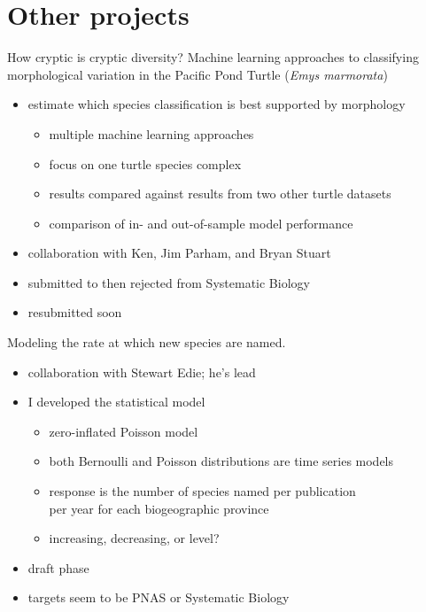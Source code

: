 \documentclass{beamer}
\begin{document}
\section{Other projects}

\begin{frame}
  \begin{block}{How cryptic is cryptic diversity? Machine learning approaches to classifying morphological variation in the Pacific Pond Turtle (\textit{Emys marmorata})}
    \begin{itemize}
      \item estimate which species classification is best supported by morphology
        \begin{itemize}
          \item multiple machine learning approaches
          \item focus on one turtle species complex
          \item results compared against results from two other turtle datasets
          \item comparison of in- and out-of-sample model performance
        \end{itemize}
      \item collaboration with Ken, Jim Parham, and Bryan Stuart
      \item submitted to then rejected from Systematic Biology
      \item resubmitted soon
    \end{itemize}
  \end{block}
\end{frame}

\begin{frame}
  \begin{block}{Modeling the rate at which new species are named.}
    \begin{itemize}
      \item collaboration with Stewart Edie; he's lead
      \item I developed the statistical model
        \begin{itemize}
          \item zero-inflated Poisson model 
          \item both Bernoulli and Poisson distributions are time series models
          \item response is the number of species named per publication \\per year for each biogeographic province
          \item increasing, decreasing, or level?
        \end{itemize}
      \item draft phase
      \item targets seem to be PNAS or Systematic Biology
    \end{itemize}
  \end{block}
\end{frame}
\end{document}
